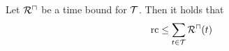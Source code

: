 \begin{theorem}
  Let ${\mathcal{R}^\sqcap}$ be a time bound for $\mathcal{T}$.
  Then it holds that 
  \[ \text{rc} \leq \sum_{t \in \mathcal{T}}{\mathcal{R}^\sqcap}(t) \]
\end{theorem}
